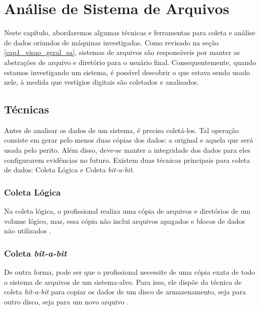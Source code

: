 \section{Análise de Sistema de Arquivos}
    
    \vspace{10.5cm}
    
    \hspace{1cm}
    Neste capítulo, abordaremos algumas técnicas e ferramentas para coleta e análise de dados oriundos de máquinas investigadas. Como revisado na seção \ref{cap1_visao_geral_sa}, sistemas de arquivos são responsáveis por manter as abstrações de arquivo e diretório para o usuário final. Consequentemente, quando estamos investigando um sistema, é possível descobrir o que estava sendo usado nele, à medida que vestígios digitais são coletados e analisados.
    
    \subsection{Técnicas}
    
    \hspace{1cm}
    Antes de analisar os dados de um sistema, é preciso coletá-los. Tal operação consiste em gerar pelo menos duas cópias dos dados: a original e aquela que será usada pelo perito. Além disso, deve-se manter a integridade dos dados para eles configurarem evidências no futuro. Existem duas técnicas principais para coleta de dados: Coleta Lógica e Coleta \textit{bit-a-bit}.
    
    \subsubsection{Coleta Lógica}
    
    \hspace{1cm}
    Na coleta lógica, o profissional realiza uma cópia de arquivos e diretórios de um volume lógico, mas, essa cópia não inclui arquivos apagados e blocos de dados não utilizados \cite{kent2006}.
    
    \subsubsection{Coleta \textit{bit-a-bit}}
    
    \hspace{1cm}
    De outra forma, pode ser que o profissional necessite de uma cópia exata de todo o sistema de arquivos de um sistema-alvo. Para isso, ele dispõe da técnica de coleta \textit{bit-a-bit} para copiar os dados de um disco de armazenamento, seja para outro disco, seja para um novo arquivo \cite{kent2006}.
    
